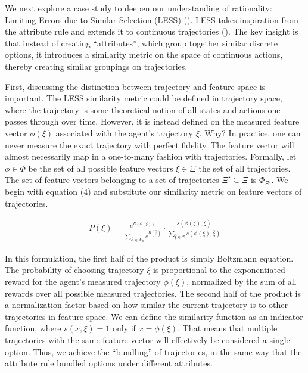 \documentclass[
  letterpaper,
  DIV=11,
  numbers=noendperiod,
  oneside]{scrreprt}
\theoremstyle{remark}
\begin{document}
We next explore a case study to deepen our understanding of rationality:
Limiting Errors due to Similar Selection (LESS)
(). LESS takes inspiration
from the attribute rule and extends it to continuous trajectories
(). The key insight is that
instead of creating ``attributes'', which group together similar
discrete options, it introduces a similarity metric on the space of
continuous actions, thereby creating similar groupings on trajectories.

First, discussing the distinction between trajectory and feature space
is important. The LESS similarity metric could be defined in trajectory
space, where the trajectory is some theoretical notion of all states and
actions one passes through over time. However, it is instead defined on
the measured feature vector \(\phi(\xi)\) associated with the agent's
trajectory \(\xi\). Why? In practice, one can never measure the exact
trajectory with perfect fidelity. The feature vector will almost
necessarily map in a one-to-many fashion with trajectories. Formally,
let \(\phi \in \Phi\) be the set of all possible feature vectors
\(\xi \in \Xi\) the set of all trajectories. The set of feature vectors
belonging to a set of trajectories \(\Xi' \subseteq \Xi\) is
\(\Phi_{\Xi'}\). We begin with equation (4) and substitute our
similarity metric on feature vectors of trajectories.

\[\begin{aligned}
    P(\xi) = \frac{e^{R(\phi(\xi))}}{\sum_{\bar{\phi} \in \Phi_{\Xi}} e^{R(\hat{\phi})}} \cdot \frac{s(\phi(\xi), \bar{\xi})}{\sum_{\hat{\xi} \in \Xi} s(\phi(\xi), \bar{\xi})}
\end{aligned}\]

In this formulation, the first half of the product is simply Boltzmann
equation. The probability of choosing trajectory \(\xi\) is proportional
to the exponentiated reward for the agent's measured trajectory
\(\phi(\xi)\), normalized by the sum of all rewards over all possible
measured trajectories. The second half of the product is a normalization
factor based on how similar the current trajectory is to other
trajectories in feature space. We can define the similarity function as
an indicator function, where \(s(x, \xi) = 1\) only if
\(x = \phi(\xi)\). That means that multiple trajectories with the same
feature vector will effectively be considered a single option. Thus, we
achieve the ``bundling'' of trajectories, in the same way that the
attribute rule bundled options under different attributes.
\end{document}
